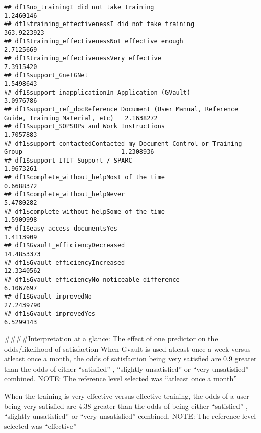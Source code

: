 \documentclass[
]{article}
\begin{document}
\begin{verbatim}
## df1$no_trainingI did not take training                                                         1.2460146
## df1$training_effectivenessI did not take training                                            363.9223923
## df1$training_effectivenessNot effective enough                                                 2.7125669
## df1$training_effectivenessVery effective                                                       7.3915420
## df1$support_GnetGNet                                                                           1.5498643
## df1$support_inapplicationIn-Application (GVault)                                               3.0976786
## df1$support_ref_docReference Document (User Manual, Reference Guide, Training Material, etc)   2.1638272
## df1$support_SOPSOPs and Work Instructions                                                      1.7057883
## df1$support_contactedContacted my Document Control or Training Group                           1.2308936
## df1$support_ITIT Support / SPARC                                                               1.9673261
## df1$complete_without_helpMost of the time                                                      0.6688372
## df1$complete_without_helpNever                                                                 5.4780282
## df1$complete_without_helpSome of the time                                                      1.5909998
## df1$easy_access_documentsYes                                                                   1.4113909
## df1$Gvault_efficiencyDecreased                                                                14.4853373
## df1$Gvault_efficiencyIncreased                                                                12.3340562
## df1$Gvault_efficiencyNo noticeable difference                                                  6.1067697
## df1$Gvault_improvedNo                                                                         27.2439790
## df1$Gvault_improvedYes                                                                         6.5299143
\end{verbatim}

\#\#\#\#Interpretation at a glance: The effect of one predictor on the
odds/likelihood of satisfaction When Gvault is used atleast once a week
versus atleast once a month, the odds of satisfaction being very
satisfied are 0.9 greater than the odds of either ``satisfied'' ,
``slightly unsatisfied'' or ``very unsatisfied'' combined. NOTE: The
reference level selected was ``atleast once a month''

When the training is very effective versus effective training, the odds
of a user being very satisfied are 4.38 greater than the odds of being
either ``satisfied'' , ``slightly unsatisfied'' or ``very unsatisfied''
combined. NOTE: The reference level selected was ``effective''
\end{document}
